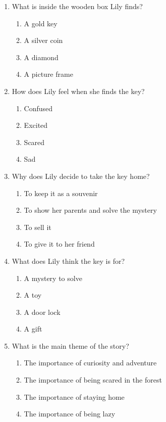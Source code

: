 \documentclass[12pt]{article}
\begin{document}
\begin{enumerate}
    \item What is inside the wooden box Lily finds?
    \begin{enumerate}[label=\Alph*.]
        \item A gold key
        \item A silver coin
        \item A diamond
        \item A picture frame
    \end{enumerate}
    \vspace{0.5cm}

    \item How does Lily feel when she finds the key?
    \begin{enumerate}[label=\Alph*.]
        \item Confused
        \item Excited
        \item Scared
        \item Sad
    \end{enumerate}
    \vspace{0.5cm}

\vspace{1cm}
    \item Why does Lily decide to take the key home?
    \begin{enumerate}[label=\Alph*.]
        \item To keep it as a souvenir
        \item To show her parents and solve the mystery
        \item To sell it
        \item To give it to her friend
    \end{enumerate}
    \vspace{0.5cm}

    \item What does Lily think the key is for?
    \begin{enumerate}[label=\Alph*.]
        \item A mystery to solve
        \item A toy
        \item A door lock
        \item A gift
    \end{enumerate}
    \vspace{0.5cm}

    \item What is the main theme of the story?
    \begin{enumerate}[label=\Alph*.]
        \item The importance of curiosity and adventure
        \item The importance of being scared in the forest
        \item The importance of staying home
        \item The importance of being lazy
    \end{enumerate}
    \vspace{0.5cm}


\end{enumerate}
\end{document}
